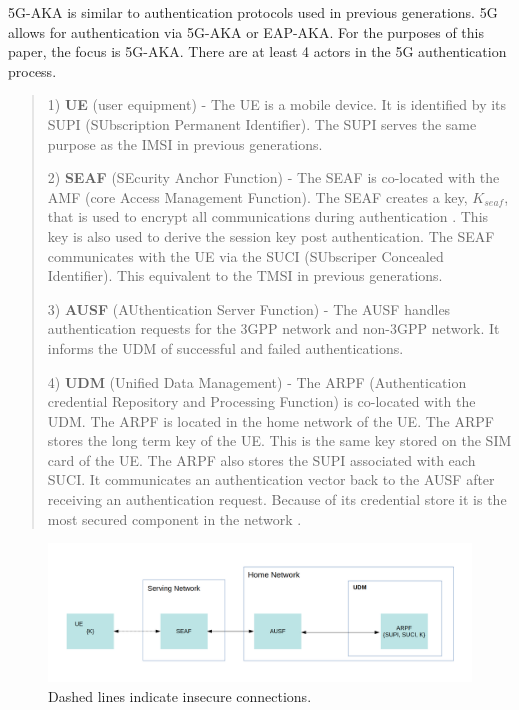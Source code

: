 \documentclass[10pt, pdftex]{article}
\begin{document}
5G-AKA is similar to authentication protocols used in previous generations.  5G allows for authentication via 5G-AKA or EAP-AKA.  For the purposes of this paper, the focus is 5G-AKA.  There are at least 4 actors in the 5G authentication process.  

\begin{quote}
1) \textbf{UE} (user equipment) -  The UE is a mobile device.  It is identified by its SUPI (SUbscription Permanent   
Identifier).  The SUPI serves the same purpose as the IMSI in previous generations.

2) \textbf{SEAF} (SEcurity Anchor Function) - The SEAF is co-located with the AMF (core Access Management Function).  The SEAF creates a key, $K_{seaf}$, that is used to encrypt all communications during authentication  \cite{zhang2017overview}.  This key is also used to derive the session key post authentication.  The SEAF communicates with the UE via the SUCI (SUbscriper Concealed Identifier).  This equivalent to the TMSI in previous generations. 

3) \textbf{AUSF} (AUthentication Server Function) -  The AUSF handles authentication requests for the 3GPP network and non-3GPP network.  It informs the UDM of successful and failed authentications.  

4) \textbf{UDM} (Unified Data Management) - The ARPF (Authentication credential Repository and Processing Function) is co-located with the UDM. The ARPF is located in the home network of the UE. The ARPF stores the long term key of the UE.  This is the same key stored on the SIM card of the UE.  The ARPF also stores the SUPI associated with each SUCI.  It communicates an authentication vector back to the AUSF after receiving an authentication request.  Because of its credential store it is the most secured component in the network \cite{cremers2017comprehensive}.

\end{quote}

\graphicspath{ {./images/} }
\begin{figure}[h]
	\begin{center}
		\includegraphics[scale=0.25]{Figure2_1.png}
	\end{center}
	\caption{Dashed lines indicate insecure connections.}
\end{figure}
\end{document}
